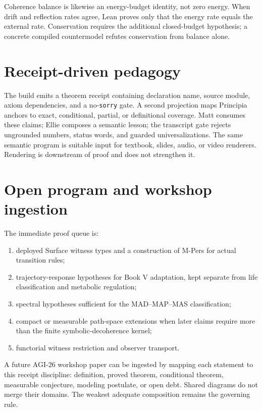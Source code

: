 \documentclass[11pt]{article}
\begin{document}
Coherence balance is likewise an energy-budget identity, not zero energy.
When drift and reflection rates agree, Lean proves only that the energy rate
equals the external rate.  Conservation requires the additional closed-budget
hypothesis; a concrete compiled countermodel refutes conservation from balance
alone.

\section{Receipt-driven pedagogy}

The build emits a theorem receipt containing declaration name, source module,
axiom dependencies, and a no-\texttt{sorry} gate.  A second projection maps
Principia anchors to exact, conditional, partial, or definitional coverage.
Matt consumes these claims; Ellie composes a semantic lesson; the transcript
gate rejects ungrounded numbers, status words, and guarded universalizations.
The same semantic program is suitable input for textbook, slides, audio, or
video renderers.  Rendering is downstream of proof and does not strengthen it.

\section{Open program and workshop ingestion}

The immediate proof queue is:
\begin{enumerate}
  \item deployed Surface witness types and a construction of M-Pers for actual
        transition rules;
  \item trajectory-response hypotheses for Book V adaptation, kept separate
        from life classification and metabolic regulation;
  \item spectral hypotheses sufficient for the MAD--MAP--MAS classification;
  \item compact or measurable path-space extensions when later claims require
        more than the finite symbolic-decoherence kernel;
  \item functorial witness restriction and observer transport.
\end{enumerate}

A future AGI-26 workshop paper can be ingested by mapping each statement to
this receipt discipline: definition, proved theorem, conditional theorem,
measurable conjecture, modeling postulate, or open debt.  Shared diagrams do
not merge their domains.  The weakest adequate composition remains the
governing rule.
\end{document}
